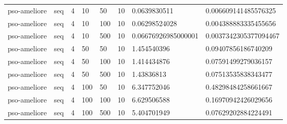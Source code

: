 \begin{table}[t]
\begin{tabular}{llllllll}
pso-ameliore & seq & 4 & 10 & 50 & 10 & 0.0639830511 & 0.006609141485576325 \\
pso-ameliore & seq & 4 & 10 & 100 & 10 & 0.06298524028 & 0.004388883335455656 \\
pso-ameliore & seq & 4 & 10 & 500 & 10 & 0.06676926985000001 & 0.0037342305377094467 \\
pso-ameliore & seq & 4 & 50 & 50 & 10 & 1.454540396 & 0.09407856186740209 \\
pso-ameliore & seq & 4 & 50 & 100 & 10 & 1.414434876 & 0.07591499279036157 \\
pso-ameliore & seq & 4 & 50 & 500 & 10 & 1.43836813 & 0.07513535838343477 \\
pso-ameliore & seq & 4 & 100 & 50 & 10 & 6.347752046 & 0.48298484258661667 \\
pso-ameliore & seq & 4 & 100 & 100 & 10 & 6.629506588 & 0.16970942426029656 \\
pso-ameliore & seq & 4 & 100 & 500 & 10 & 5.404701949 & 0.07629202884224491 \\
\bottomrule
\end{tabular}
\end{table}
